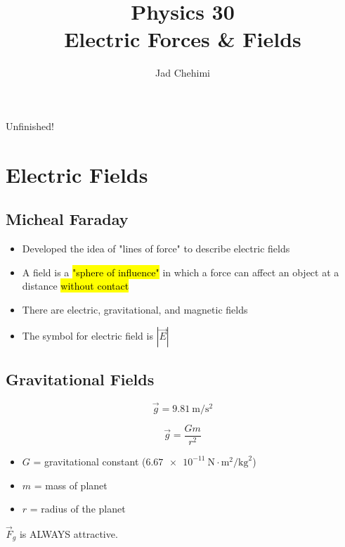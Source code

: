 \documentclass[a4paper,12pt]{article}
\title{Physics 30 \\ Electric Forces \& Fields}
\author{Jad Chehimi}
\begin{document}
\maketitle

\begin{center}
\Huge
Unfinished!
\normalsize
\end{center}

\tableofcontents

\pagebreak

\section{Electric Fields}
\subsection{Micheal Faraday}
\begin{itemize}
    \item{Developed the idea of "lines of force" to describe electric fields}
    \item{A field is a \hl{"sphere of influence"} in which a force can affect an object at a distance \hl{without contact}}
    \item{There are electric, gravitational, and magnetic fields}
    \item{The symbol for electric field is $|\vec{E}|$}
\end{itemize}

\subsection{Gravitational Fields}
\Large $$\vec{g} = \SI{9.81}{\m\per\s\squared}$$ \normalsize

\Large $$\vec{g} = \frac{Gm}{r^2}$$ \normalsize
\begin{itemize}
    \item{$G$ = gravitational constant ($\SI{6.67e-11}{\N\cdot\m\squared\per\kg\squared}$)}
    \item{$m$ = mass of planet}
    \item{$r$ = radius of the planet}
\end{itemize}

$\vec{F}_g$ is ALWAYS attractive.

\pagebreak
\end{document}
